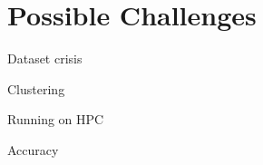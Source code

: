 \section{Possible Challenges}
\label{sec:challenges}

Dataset crisis

Clustering

Running on HPC

Accuracy